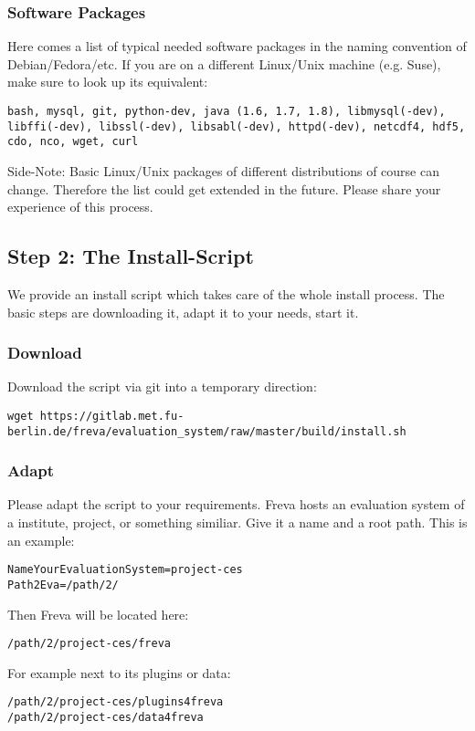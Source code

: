 \documentclass[a4paper,11pt]{ltxdoc}
\begin{document}
\subsubsection{Software Packages}
Here comes a list of typical needed software packages in the naming convention of Debian/Fedora/etc. If you are on a different Linux/Unix machine (e.g. Suse), make sure to look up its equivalent: 
\begin{lstlisting} 
bash, mysql, git, python-dev, java (1.6, 1.7, 1.8), libmysql(-dev), libffi(-dev), libssl(-dev), libsabl(-dev), httpd(-dev), netcdf4, hdf5, cdo, nco, wget, curl\end{lstlisting}
Side-Note: Basic Linux/Unix packages of different distributions of course can change. Therefore the list could get extended in the future. Please share your experience of this process. 
\subsection{Step 2: The Install-Script}
We provide an install script which takes care of the whole install process. The basic steps are downloading it, adapt it to your needs, start it.
\subsubsection{Download}
Download the script via git into a temporary direction:
\begin{lstlisting}
wget https://gitlab.met.fu-berlin.de/freva/evaluation_system/raw/master/build/install.sh \end{lstlisting}
\subsubsection{Adapt}
Please adapt the script to your requirements. Freva hosts an evaluation system of a institute, project, or something similiar. Give it a name and a root path. This is an example:
\begin{lstlisting}
NameYourEvaluationSystem=project-ces
Path2Eva=/path/2/\end{lstlisting}
Then Freva will be located here:
\begin{lstlisting}
/path/2/project-ces/freva\end{lstlisting}
For example next to its plugins or data:
\begin{lstlisting}
/path/2/project-ces/plugins4freva
/path/2/project-ces/data4freva
\end{lstlisting}
\end{document}
